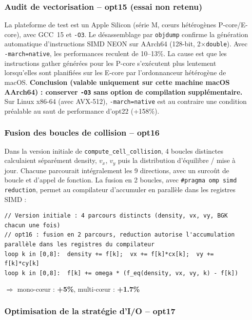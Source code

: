 \documentclass[a4paper,11pt,oneside]{report}
\newcommand{\code}[1]{\texttt{#1}}
\begin{document}
\subsubsection{Audit de vectorisation -- opt15 (essai non retenu)}

La plateforme de test est un Apple Silicon (série M, cœurs hétérogènes P-core/E-core), avec GCC~15 et \texttt{-O3}. Le désassemblage par \code{objdump} confirme la génération automatique d'instructions SIMD NEON sur AArch64 (128-bit, 2$\times$\code{double}). Avec \texttt{-march=native}, les performances reculent de 10--13\%. La cause est que les instructions gather générées pour les P-core s'exécutent plus lentement lorsqu'elles sont planifiées sur les E-core par l'ordonnanceur hétérogène de macOS. \textbf{Conclusion (valable uniquement sur cette machine macOS AArch64) : conserver \texttt{-O3} sans option de compilation supplémentaire.} Sur Linux x86-64 (avec AVX-512), \texttt{-march=native} est au contraire une condition préalable au saut de performance d'opt22 (+158\%).

\subsubsection{Fusion des boucles de collision -- opt16}

Dans la version initiale de \code{compute\_cell\_collision}, 4 boucles distinctes calculaient
séparément density, $v_x$, $v_y$ puis la distribution d'équilibre / mise à jour. Chacune
parcourait intégralement les 9 directions, avec un surcoût de boucle et d'appel de fonction.
La fusion en 2 boucles, avec \code{\#pragma omp simd reduction}, permet au compilateur
d'accumuler en parallèle dans les registres SIMD :

\begin{lstlisting}[language={}]
// Version initiale : 4 parcours distincts (density, vx, vy, BGK chacun une fois)
// opt16 : fusion en 2 parcours, reduction autorise l'accumulation parallèle dans les registres du compilateur
loop k in [0,8]:  density += f[k];  vx += f[k]*cx[k];  vy += f[k]*cy[k]
loop k in [0,8]:  f[k] += omega * (f_eq(density, vx, vy, k) - f[k])
\end{lstlisting}

$\Rightarrow$ mono-cœur : \textbf{+5\%}, multi-cœur : \textbf{+1.7\%}

\subsubsection{Optimisation de la stratégie d'I/O -- opt17}
\end{document}

